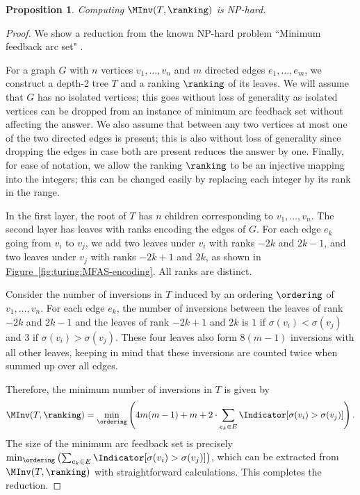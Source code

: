 \documentclass[11pt]{article}
\numberwithin{equation}{section}
\newtheorem{proposition}[theorem]{Proposition}
\theoremstyle{definition}
\theoremstyle{plain}
\newcommand{\expref}[2]{\hyperref[#2]{#1~\ref{#2}}}
\begin{document}
\begin{proposition}
    Computing $\MInv(T,\ranking)$ is NP-hard.
\end{proposition}

\begin{proof}
%
%
%
%
%
%
%
    We show a reduction from the known NP-hard problem ``Minimum feedback arc set" \cite{Karp1972}.

    For a graph $G$ with $n$ vertices $v_1,\dots,v_n$ and $m$ directed edges $e_1,\dots,e_m$, we construct a depth-2 tree $T$ and a ranking $\ranking$ of its leaves. We will assume that $G$ has no isolated vertices; this goes without loss of generality as isolated vertices can be dropped from an instance of minimum arc feedback set without affecting the answer. We also assume that between any two vertices at most one of the two directed edges is present; this is also without loss of generality since dropping the edges in case both are present reduces the answer by one. Finally, for ease of notation, we allow the ranking $\ranking$ to be an injective mapping into the integers; this can be changed easily by replacing each integer by its rank in the range.
        
    In the first layer, the root of $T$ has $n$ children corresponding to $v_1,\dots,v_n$. The second layer has leaves with ranks encoding the edges of $G$. For each edge $e_k$ going from $v_i$ to $v_j$, we add two leaves under $v_i$ with ranks $-2k$ and $2k-1$, and two leaves under $v_j$ with ranks $-2k+1$ and $2k$, as shown in \expref{Figure}{fig:turing:MFAS-encoding}. All ranks are distinct.
    
    Consider the number of inversions in $T$ induced by an ordering $\ordering$ of $v_1,\dots,v_n$. For each edge $e_k$, the number of inversions between the leaves of rank $-2k$ and $2k-1$ and the leaves of rank $-2k+1$ and $2k$ is $1$ if $\sigma(v_i)<\sigma(v_j)$ and $3$ if $\sigma(v_i)>\sigma(v_j)$. These four leaves also form $8(m-1)$ inversions with all other leaves, keeping in mind that these inversions are counted twice when summed up over all edges.
    
    Therefore, the minimum number of inversions in $T$ is given by
    \begin{equation*}
        \MInv(T,\ranking)=\min_{\ordering} \left(4m(m-1)+m+ 2\cdot\sum_{e_k\in E}\Indicator[\sigma(v_i)>\sigma(v_j)]\right).
    \end{equation*}
    The size of the minimum arc feedback set is precisely $\min_{\ordering} \left( \sum_{e_k\in E}\Indicator[\sigma(v_i)>\sigma(v_j)] \right)$, which can be extracted from $\MInv(T,\ranking)$ with straightforward calculations. This completes the reduction.
\end{proof}
\end{document}
